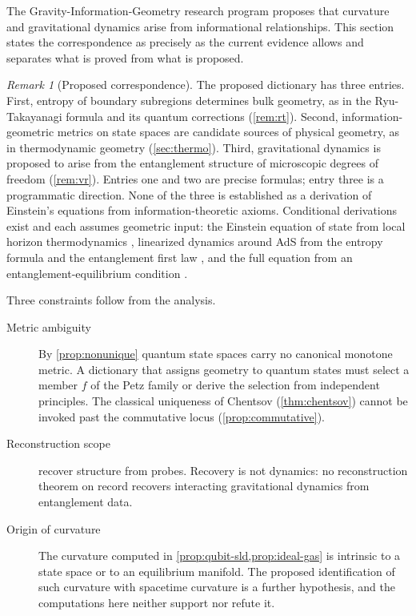 \documentclass[11pt,letterpaper]{article}
\theoremstyle{definition}
\theoremstyle{remark}
\newtheorem{remark}[theorem]{Remark}
\begin{document}
The Gravity-Information-Geometry research program proposes that curvature and gravitational dynamics arise from informational relationships. This section states the correspondence as precisely as the current evidence allows and separates what is proved from what is proposed.

\begin{remark}[Proposed correspondence]
\label{rem:correspondence}
The proposed dictionary has three entries. First, entropy of boundary subregions determines bulk geometry, as in the Ryu-Takayanagi formula and its quantum corrections (\cref{rem:rt}). Second, information-geometric metrics on state spaces are candidate sources of physical geometry, as in thermodynamic geometry (\cref{sec:thermo}). Third, gravitational dynamics is proposed to arise from the entanglement structure of microscopic degrees of freedom (\cref{rem:vr}). Entries one and two are precise formulas; entry three is a programmatic direction. None of the three is established as a derivation of Einstein's equations from information-theoretic axioms. Conditional derivations exist and each assumes geometric input: the Einstein equation of state from local horizon thermodynamics \cite{jacobson}, linearized dynamics around AdS from the entropy formula and the entanglement first law \cite{fgkmv, lmvr}, and the full equation from an entanglement-equilibrium condition \cite{jac2016}.
\end{remark}

Three constraints follow from the analysis.

\begin{description}
\item[Metric ambiguity] By \cref{prop:nonunique} quantum state spaces carry no canonical monotone metric. A dictionary that assigns geometry to quantum states must select a member $f$ of the Petz family or derive the selection from independent principles. The classical uniqueness of Chentsov (\cref{thm:chentsov}) cannot be invoked past the commutative locus (\cref{prop:commutative}).
\item[Reconstruction scope]  recover structure from probes. Recovery is not dynamics: no reconstruction theorem on record recovers interacting gravitational dynamics from entanglement data.
\item[Origin of curvature] The curvature computed in \cref{prop:qubit-sld,prop:ideal-gas} is intrinsic to a state space or to an equilibrium manifold. The proposed identification of such curvature with spacetime curvature is a further hypothesis, and the computations here neither support nor refute it.
\end{description}
\end{document}
